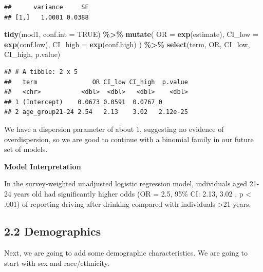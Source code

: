 \documentclass[
]{article}
\newenvironment{Shaded}{\begin{snugshade}}{\end{snugshade}}
\newcommand{\AttributeTok}[1]{\textcolor[rgb]{0.13,0.29,0.53}{#1}}
\newcommand{\ConstantTok}[1]{\textcolor[rgb]{0.56,0.35,0.01}{#1}}
\newcommand{\FunctionTok}[1]{\textcolor[rgb]{0.13,0.29,0.53}{\textbf{#1}}}
\newcommand{\NormalTok}[1]{#1}
\newcommand{\SpecialCharTok}[1]{\textcolor[rgb]{0.81,0.36,0.00}{\textbf{#1}}}
\begin{document}
\begin{Shaded}
\end{Shaded}

\begin{verbatim}
##      variance     SE
## [1,]   1.0001 0.0388
\end{verbatim}

\begin{Shaded}
\begin{Highlighting}[]
\FunctionTok{tidy}\NormalTok{(mod1, }\AttributeTok{conf.int =} \ConstantTok{TRUE}\NormalTok{) }\SpecialCharTok{\%\textgreater{}\%}
  \FunctionTok{mutate}\NormalTok{(}
    \AttributeTok{OR =} \FunctionTok{exp}\NormalTok{(estimate),}
    \AttributeTok{CI\_low =} \FunctionTok{exp}\NormalTok{(conf.low),}
    \AttributeTok{CI\_high =} \FunctionTok{exp}\NormalTok{(conf.high)}
\NormalTok{  ) }\SpecialCharTok{\%\textgreater{}\%}
  \FunctionTok{select}\NormalTok{(term, OR, CI\_low, CI\_high, p.value)}
\end{Highlighting}
\end{Shaded}

\begin{verbatim}
## # A tibble: 2 x 5
##   term               OR CI_low CI_high  p.value
##   <chr>           <dbl>  <dbl>   <dbl>    <dbl>
## 1 (Intercept)    0.0673 0.0591  0.0767 0       
## 2 age_group21-24 2.54   2.13    3.02   2.12e-25
\end{verbatim}

We have a dispersion parameter of about 1, suggesting no evidence of
overdispersion, so we are good to continue with a binomial family in our
future set of models.

\textbf{Model Interpretation}

In the survey-weighted unadjusted logistic regression model, individuals
aged 21-24 years old had significantly higher odds (OR = 2.5, 95\% CI:
2.13, 3.02 , p \textless{} .001) of reporting driving after drinking
compared with individuals \textgreater21 years.

\subsection{2.2 Demographics}\label{demographics}

Next, we are going to add some demographic characteristics. We are going
to start with sex and race/ethnicity.
\end{document}
